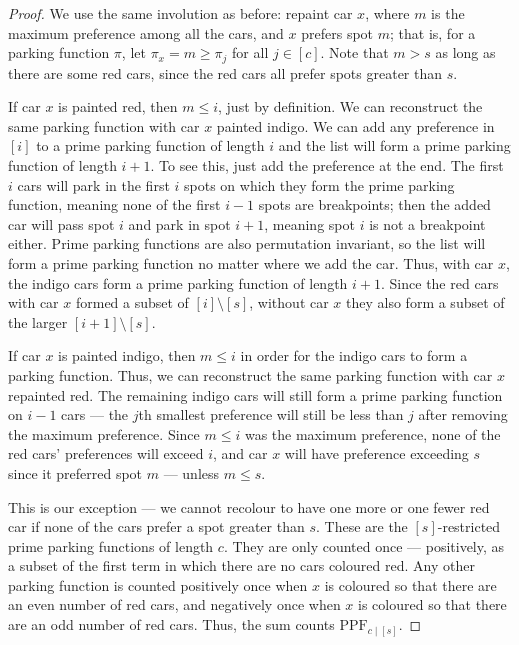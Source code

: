 \documentclass[12 pt]{amsart}
\theoremstyle{definition} %
\theoremstyle{remark} %
\begin{document}
\begin{proof}
	We use the same involution as before: repaint car $x$, where $m$ is the maximum preference among all the cars, and $x$ prefers spot $m$; that is, for a parking function $\pi$, let $\pi_{x} = m \ge \pi_{j}$ for all $j \in [c]$. Note that $m > s$ as long as there are some red cars, since the red cars all prefer spots greater than $s$.

	If car $x$ is painted red, then  $m \le i$, just by definition. We can reconstruct the same parking function with car $x$ painted indigo. We can add any preference in $[i]$ to a prime parking function of length $i$ and the list will form a prime parking function of length $i + 1$. To see this, just add the preference at the end. The first $i$ cars will park in the first $i$ spots on which they form the prime parking function, meaning none of the first $i-1$ spots are breakpoints; then the added car will pass spot $i$ and park in spot $i+1$, meaning spot $i$ is not a breakpoint either. Prime parking functions are also permutation invariant, so the list will form a prime parking function no matter where we add the car. Thus, with car $x$, the indigo cars form a prime parking function of length $i + 1$. Since the red cars with car $x$ formed a subset of $[i] \setminus [s]$, without car $x$ they also form a subset of the larger $[i + 1] \setminus [s]$.

	If car $x$ is painted indigo, then $m \le i$ in order for the indigo cars to form a parking function. Thus, we can reconstruct the same parking function with car $x$ repainted red. The remaining indigo cars will still form a prime parking function on $i - 1$ cars --- the $j$th smallest preference will still be less than $j$ after removing the maximum preference. Since $m \le i$ was the maximum preference, none of the red cars' preferences will exceed $i$, and car $x$ will have preference exceeding $s$ since it preferred spot $m$ --- unless $m \le s$.

	This is our exception --- we cannot recolour to have one more or one fewer red car if none of the cars prefer a spot greater than $s$. These are the $[s]$-restricted prime parking functions of length $c$. They are only counted once --- positively, as a subset of the first term in which there are no cars coloured red. Any other parking function is counted positively once when $x$ is coloured so that there are an even number of red cars, and negatively once when $x$ is coloured so that there are an odd number of red cars. Thus, the sum counts $\mathrm{PPF}_{c \mid [s]}$.
\end{proof}
\end{document}

